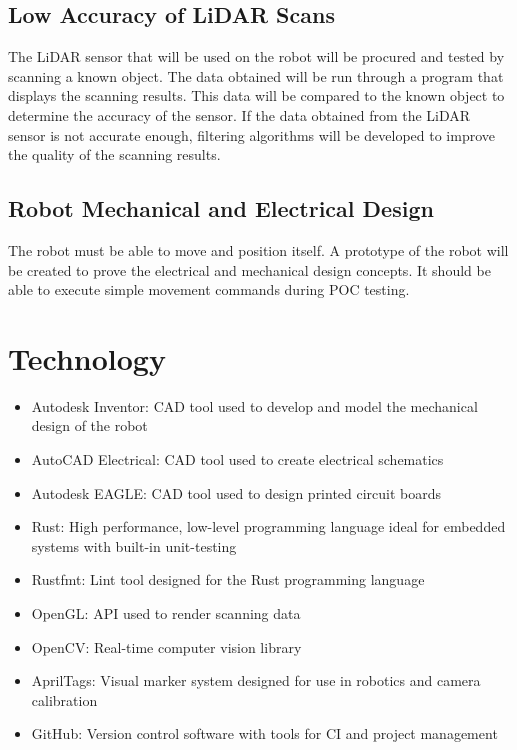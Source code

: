 \documentclass[titlepage]{article}
\begin{document}
\subsection{Low Accuracy of LiDAR Scans}

The LiDAR sensor that will be used on the robot will be procured and tested by scanning a known object. The data obtained will be run through a program that displays the scanning results. This data will be compared to the known object to determine the accuracy of the sensor. If the data obtained from the LiDAR sensor is not accurate enough, filtering algorithms will be developed to improve the quality of the scanning results.

\subsection{Robot Mechanical and Electrical Design}

The robot must be able to move and position itself. A prototype of the robot will be created to prove the electrical and mechanical design concepts. It should be able to execute simple movement commands during POC testing.

\section{Technology}

\begin{itemize}
\item Autodesk Inventor: CAD tool used to develop and model the mechanical design of the robot
\item AutoCAD Electrical: CAD tool used to create electrical schematics
\item Autodesk EAGLE: CAD tool used to design printed circuit boards
\item Rust: High performance, low-level programming language ideal for embedded systems with built-in unit-testing
\item Rustfmt: Lint tool designed for the Rust programming language
\item OpenGL: API used to render scanning data
\item OpenCV: Real-time computer vision library 
\item AprilTags: Visual marker system designed for use in robotics and camera calibration
\item GitHub: Version control software with tools for CI and project management

\end{itemize}
\end{document}
